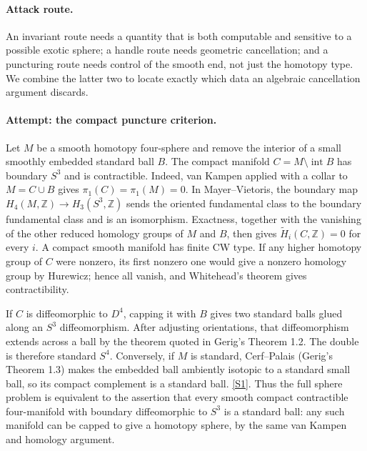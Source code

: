 \documentclass[11pt,a4paper]{article}
\newcommand{\Z}{\mathbb{Z}}
\newcommand{\sref}[2]{\hyperlink{source:#1:#2}{[S#2]}}
\begin{document}
\paragraph{Attack route.}
An invariant route needs a quantity that is both computable and sensitive
to a possible exotic sphere; a handle route needs geometric cancellation;
and a puncturing route needs control of the smooth end, not just the
homotopy type. We combine the latter two to locate exactly which data an
algebraic cancellation argument discards.

\paragraph{Attempt: the compact puncture criterion.}
Let $M$ be a smooth homotopy four-sphere and remove the interior of a
small smoothly embedded standard ball $B$. The compact manifold
$C=M\setminus\operatorname{int}B$ has boundary $S^3$ and is contractible.
Indeed, van Kampen applied with a collar to $M=C\cup B$ gives
$\pi_1(C)=\pi_1(M)=0$. In Mayer--Vietoris, the boundary map
$H_4(M,\Z)\to H_3(S^3,\Z)$ sends the oriented fundamental class to the
boundary fundamental class and is an isomorphism. Exactness, together
with the vanishing of the other reduced homology groups of $M$ and $B$,
then gives $\widetilde H_i(C,\Z)=0$ for every $i$.
A compact smooth manifold has finite CW type. If any higher homotopy group
of $C$ were nonzero, its first nonzero one would give a nonzero homology
group by Hurewicz; hence all vanish, and Whitehead's theorem gives
contractibility.

If $C$ is diffeomorphic to $D^4$, capping it with $B$ gives two standard
balls glued along an $S^3$ diffeomorphism. After adjusting orientations,
that diffeomorphism extends across a ball by the theorem quoted in
Gerig's Theorem 1.2. The double is therefore standard $S^4$.
Conversely, if $M$ is standard, Cerf--Palais (Gerig's Theorem 1.3) makes
the embedded ball ambiently isotopic to a standard small ball, so its
compact complement is a standard ball. \sref{statement}{1}.
Thus the full sphere problem is equivalent to the assertion that every
smooth compact contractible four-manifold with boundary diffeomorphic to
$S^3$ is a standard ball: any such manifold can be capped to give a
homotopy sphere, by the same van Kampen and homology argument.
\end{document}
